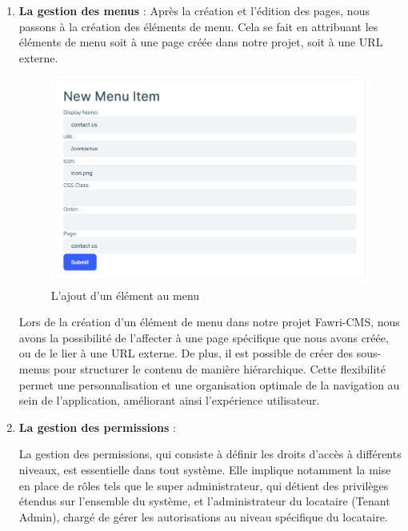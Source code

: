\begin{enumerate}
    \item \textbf{La gestion des menus} :
          Après la création et l'édition des pages, nous passons à la création des éléments de menu. Cela se fait en attribuant les éléments de menu soit à une page créée dans notre projet, soit à une URL externe.

          \begin{figure}[H]
              \centering
              \includegraphics[width=12cm]{Figures/menu item.PNG}
              \caption{L'ajout d'un élément au menu}
          \end{figure}

          Lors de la création d'un élément de menu dans notre projet Fawri-CMS, nous avons la possibilité de l'affecter à une page spécifique que nous avons créée, ou de le lier à une URL externe. De plus, il est possible de créer des sous-menus pour structurer le contenu de manière hiérarchique. Cette flexibilité permet une personnalisation et une organisation optimale de la navigation au sein de l'application, améliorant ainsi l'expérience utilisateur.




    \item \textbf{La gestion des permissions} :


          La gestion des permissions, qui consiste à définir les droits d'accès à différents niveaux, est essentielle dans tout système. Elle implique notamment la mise en place de rôles tels que le super administrateur, qui détient des privilèges étendus sur l'ensemble du système, et l'administrateur du locataire (Tenant Admin), chargé de gérer les autorisations au niveau spécifique du locataire.


\end{enumerate}
